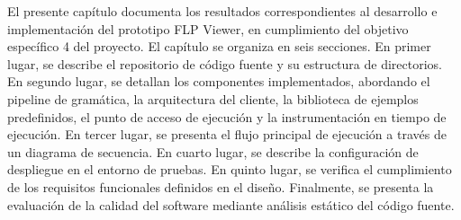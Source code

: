 El presente capítulo documenta los resultados correspondientes al desarrollo e implementación del prototipo FLP Viewer, en cumplimiento del objetivo específico 4 del proyecto. El capítulo se organiza en seis secciones. En primer lugar, se describe el repositorio de código fuente y su estructura de directorios. En segundo lugar, se detallan los componentes implementados, abordando el pipeline de gramática, la arquitectura del cliente, la biblioteca de ejemplos predefinidos, el punto de acceso de ejecución y la instrumentación en tiempo de ejecución. En tercer lugar, se presenta el flujo principal de ejecución a través de un diagrama de secuencia. En cuarto lugar, se describe la configuración de despliegue en el entorno de pruebas. En quinto lugar, se verifica el cumplimiento de los requisitos funcionales definidos en el diseño. Finalmente, se presenta la evaluación de la calidad del software mediante análisis estático del código fuente.












